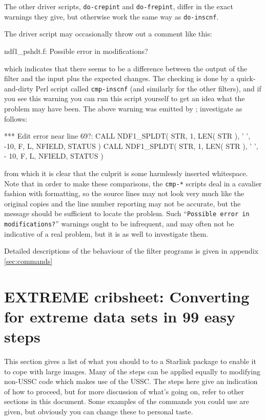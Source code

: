 \documentclass[twoside,11pt,nolof]{starlink}
\providecommand{\xdofilter}[1]{\htmlref{\texttt{do-#1}}{do-xxx}}
\providecommand{\file}[1]{\texttt{#1}}
\providecommand{\dofilter}[1]{\texttt{do-#1}}
\newenvironment{squote}{\begin{small}}{\end{small}}
\begin{document}
The other driver scripts, \dofilter{crepint} and \dofilter{frepint},
differ in the exact warnings they give, but otherwise work the
same way as \dofilter{inscnf}.

The driver script may occasionally throw out a comment like this:
\begin{squote}
\begin{terminalv}
ndf1_pshdt.f:              Possible error in modifications?
\end{terminalv}
\end{squote}
which indicates that there seems to be a difference between
the output of the filter and the input plus the expected changes.
The checking is done by a quick-and-dirty Perl script called
\file{cmp-inscnf} (and similarly for the other filters),
and if you see this warning you can run this script yourself
to get an idea what the problem may have been.
The above warning was emitted by \xdofilter{frepint}; investigate
as follows:
\begin{squote}
\begin{terminalv}
 *** Edit error near line 69?:
 CALL NDF1_SPLDT( STR, 1, LEN( STR ), ' ', -10, F, L, NFIELD, STATUS )
 CALL NDF1_SPLDT( STR, 1, LEN( STR ), ' ', - 10, F, L, NFIELD, STATUS )
\end{terminalv}
\end{squote}
from which it is clear that the culprit is some harmlessly inserted
whitespace.
Note that in order to make these comparisons, the \file{cmp-*} scripts
deal in a cavalier fashion with formatting, so the source
lines may not look very much like the original copies and the line number
reporting may not be accurate, but the message
should be sufficient to locate the problem.
Such ``\texttt{Possible error in modifications?}''
warnings ought to be infrequent, and may often not be indicative
of a real problem, but it is as well to investigate them.

Detailed descriptions of the behaviour of the filter programs is
given in appendix \ref{sec:commands}


\section{EXTREME cribsheet: Converting for extreme data sets in 99 easy
                            steps\label{sec:cribsheet}}

This section gives a list of what you should to to
a Starlink package to enable it to cope with large images.
Many of the steps can be applied equally
to modifying non-USSC code which makes use of the USSC.
The steps here give an indication of how to proceed,
but for more discussion of what's going on, refer to other sections
in this document.
Some examples of the commands you could use are given,
but obviously you can change these to personal taste.
\end{document}
